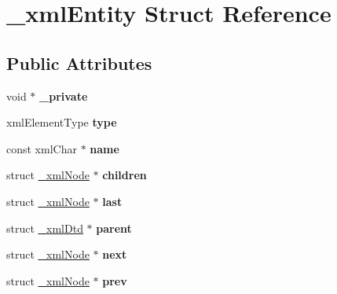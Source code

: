 \hypertarget{struct__xml_entity}{}\section{\+\_\+xml\+Entity Struct Reference}
\label{struct__xml_entity}
\subsection*{Public Attributes}
\begin{DoxyCompactItemize}
\item 
\mbox{\label{struct__xml_entity_a8d8ebc67add6e39cfa504b01499b8747}} 
void $\ast$ {\bfseries \+\_\+private}
\item 
\mbox{\label{struct__xml_entity_ac3b4e1ec2a9713ed75c05395c925f994}} 
xml\+Element\+Type {\bfseries type}
\item 
\mbox{\label{struct__xml_entity_a81a435176b4605b20a9f9dbb6ad001d9}} 
const xml\+Char $\ast$ {\bfseries name}
\item 
\mbox{\label{struct__xml_entity_a917dfc510417945d25dd2e687157b68d}} 
struct \mbox{\hyperlink{struct__xml_node}{\+\_\+xml\+Node}} $\ast$ {\bfseries children}
\item 
\mbox{\label{struct__xml_entity_a8c396e1792dc1c14c8187afe40e63f80}} 
struct \mbox{\hyperlink{struct__xml_node}{\+\_\+xml\+Node}} $\ast$ {\bfseries last}
\item 
\mbox{\label{struct__xml_entity_aad8c155ad98cec309a9a60c03c262d7d}} 
struct \mbox{\hyperlink{struct__xml_dtd}{\+\_\+xml\+Dtd}} $\ast$ {\bfseries parent}
\item 
\mbox{\label{struct__xml_entity_afef709661a94fe35cd1ae664f536d6b3}} 
struct \mbox{\hyperlink{struct__xml_node}{\+\_\+xml\+Node}} $\ast$ {\bfseries next}
\item 
\mbox{\label{struct__xml_entity_a4e2e6c655941635a7627957b2fd4ac16}} 
struct \mbox{\hyperlink{struct__xml_node}{\+\_\+xml\+Node}} $\ast$ {\bfseries prev}
\item 

\end{DoxyCompactItemize}
